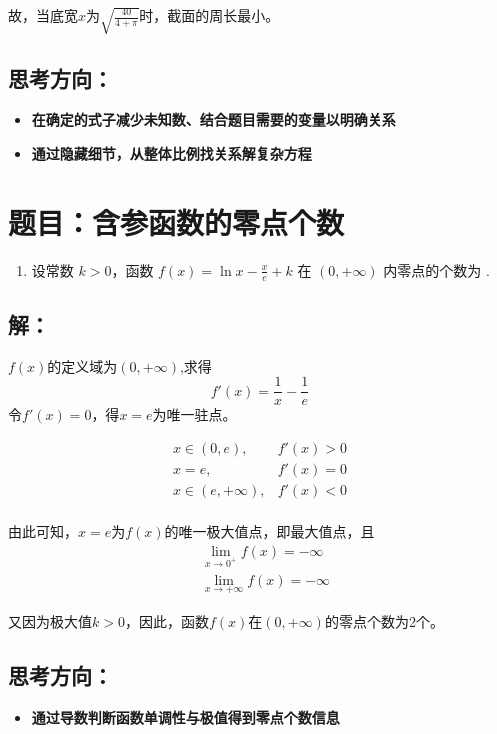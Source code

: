 \documentclass[UTF8]{ctexart}
\begin{document}
故，当底宽$x$为$\sqrt{\frac{40}{4+\pi}}$时，截面的周长最小。

\subsection*{思考方向：}
\begin{itemize}
    \item \textbf{在确定的式子减少未知数、结合题目需要的变量以明确关系}
    \item \textbf{通过隐藏细节，从整体比例找关系解复杂方程}
\end{itemize}


\newpage


\section{题目：含参函数的零点个数}

\begin{enumerate}
    \item[] 设常数 $k > 0$，函数 $f(x) = \ln x - \frac{x}{e} + k$ 在 $(0, +\infty)$ 内零点的个数为 \underline{\hspace{4cm}} .
\end{enumerate}

\subsection*{解：}
$f(x)$的定义域为$\left( 0, + \infty \right)$,求得
\begin{equation*}
    f'(x)= \frac{1}{x}-\frac{1}{e} 
\end{equation*}
令$f'(x)=0$，得$x=e$为唯一驻点。

\begin{align*}
    x \in (0,e),&f'(x) > 0 \\
    x = e,&f'(x) = 0 \\
    x \in (e,+\infty),&f'(x) < 0 \\
\end{align*}

由此可知，$x=e$为$f(x)$的唯一极大值点，即最大值点，且
\begin{align*}
    &\lim_{x \to 0^{+}} f(x) = - \infty \\
    &\lim_{x \to +\infty}f(x) = -\infty
\end{align*}

又因为极大值$k>0$，因此，函数$f(x)$在$(0,+\infty)$的零点个数为2个。
\\

\subsection*{思考方向：}
\begin{itemize}
    \item \textbf{通过导数判断函数单调性与极值得到零点个数信息}
\end{itemize}
\end{document}

